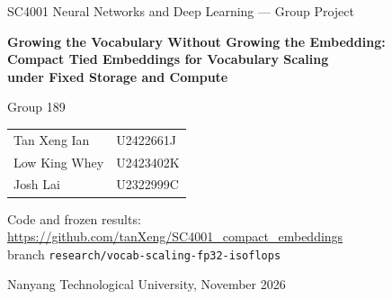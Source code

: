 \documentclass[10pt,a4paper]{article}
\begin{document}
\hypersetup{pageanchor=false}

\begin{titlepage}
\centering
\vspace*{2.5cm}
{\large SC4001 Neural Networks and Deep Learning --- Group Project\par}
\vspace{1.5cm}
{\LARGE\bfseries Growing the Vocabulary Without Growing the Embedding:\\[4pt]
Compact Tied Embeddings for Vocabulary Scaling\\[4pt] under Fixed Storage and Compute\par}
\vspace{1.8cm}
{\large Group 189 \par}
\vspace{0.8cm}
\begin{tabular}{ll}
Tan Xeng Ian & U2422661J\\
Low King Whey & U2423402K\\
Josh Lai & U2322999C\\
\end{tabular}
\vfill
{Code and frozen results: \url{https://github.com/tanXeng/SC4001_compact_embeddings}\\
branch \texttt{research/vocab-scaling-fp32-isoflops}\par}
\vspace{0.6cm}
{Nanyang Technological University, November 2026\par}
\end{titlepage}

\tableofcontents
\clearpage
\setcounter{page}{1}
\hypersetup{pageanchor=true}
\end{document}
